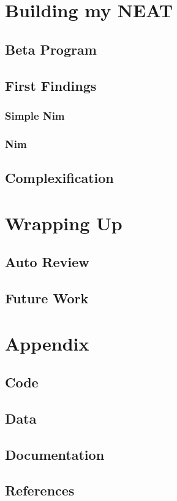 \documentclass[11pt, a4paper]{report}
\begin{document}
    \chapter{Building my NEAT}
        \section{Beta Program}
        \section{First Findings}
            \subsection{Simple Nim}
            \subsection{Nim}
        \section{Complexification}
    \chapter{Wrapping Up}
        \section{Auto Review}
        \section{Future Work}
    \chapter{Appendix}
        \section{Code}
        \section{Data}
        \section{Documentation}
        \section{References}
\end{document}
